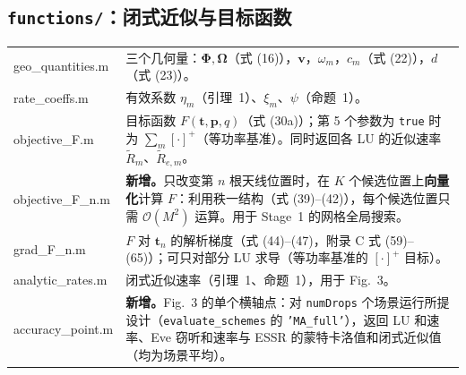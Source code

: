 \documentclass[11pt,a4paper]{ctexart}
\newcommand{\code}[1]{\texttt{#1}}
\newcommand{\bt}{\mathbf t}
\begin{document}
\subsection{\code{functions/}：闭式近似与目标函数}
\begin{longtable}{>{\ttfamily\small}p{4.6cm}p{11.2cm}}
\toprule
geo\_quantities.m & 三个几何量：$\boldsymbol\Phi,\boldsymbol\Omega$（式 (16)），$\mathbf v$，$\omega_m$，$c_m$（式 (22)），$d$（式 (23)）。\\
rate\_coeffs.m & 有效系数 $\eta_m$（引理~1）、$\xi_m$、$\psi$（命题~1）。\\
objective\_F.m & 目标函数 $F(\bt,\mathbf p,q)$（式 (30a)）；第 5 个参数为 \code{true} 时为 $\sum_m[\cdot]^+$（等功率基准）。同时返回各 LU 的近似速率 $\tilde R_m$、$\tilde R_{e,m}$。\\
objective\_F\_n.m & \textbf{新增。}只改变第 $n$ 根天线位置时，在 $K$ 个候选位置上\textbf{向量化}计算 $F$：利用秩一结构（式 (39)--(42)），每个候选位置只需 $\mathcal O(M^2)$ 运算。用于 Stage~1 的网格全局搜索。\\
grad\_F\_n.m & $F$ 对 $\bt_n$ 的解析梯度（式 (44)--(47)，附录 C 式 (59)--(65)）；可只对部分 LU 求导（等功率基准的 $[\cdot]^+$ 目标）。\\
analytic\_rates.m & 闭式近似速率（引理~1、命题~1），用于 Fig.~3。\\
accuracy\_point.m & \textbf{新增。}Fig.~3 的单个横轴点：对 \code{numDrops} 个场景运行所提设计（\code{evaluate\_schemes} 的 \code{'MA\_full'}），返回 LU 和速率、Eve 窃听和速率与 ESSR 的蒙特卡洛值和闭式近似值（均为场景平均）。\\
\bottomrule
\end{longtable}
\end{document}
